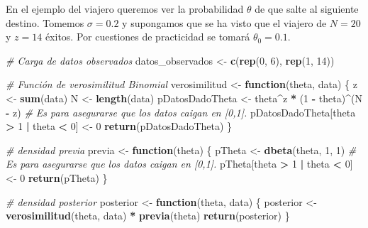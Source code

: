 \documentclass[
  12pt,
]{book}
\newenvironment{Shaded}{\begin{snugshade}}{\end{snugshade}}
\newcommand{\CommentTok}[1]{\textcolor[rgb]{0.56,0.35,0.01}{\textit{#1}}}
\newcommand{\ControlFlowTok}[1]{\textcolor[rgb]{0.13,0.29,0.53}{\textbf{#1}}}
\newcommand{\DecValTok}[1]{\textcolor[rgb]{0.00,0.00,0.81}{#1}}
\newcommand{\KeywordTok}[1]{\textcolor[rgb]{0.13,0.29,0.53}{\textbf{#1}}}
\newcommand{\NormalTok}[1]{#1}
\newcommand{\OperatorTok}[1]{\textcolor[rgb]{0.81,0.36,0.00}{\textbf{#1}}}
\newcommand{\StringTok}[1]{\textcolor[rgb]{0.31,0.60,0.02}{#1}}
\theoremstyle{definition}
\theoremstyle{definition}
\theoremstyle{definition}
\theoremstyle{remark}
\begin{document}
En el ejemplo del viajero queremos ver la probabilidad \(\theta\) de
que salte al siguiente destino. Tomemos \(\sigma=0.2\) y supongamos
que se ha visto que el viajero de \(N=20\) y \(z=14\) éxitos. Por
cuestiones de practicidad se tomará \(\theta_0 = 0.1\).

\begin{Shaded}
\begin{Highlighting}[]
\CommentTok{# Carga de datos observados}
\NormalTok{datos_observados <-}\StringTok{ }\KeywordTok{c}\NormalTok{(}\KeywordTok{rep}\NormalTok{(}\DecValTok{0}\NormalTok{, }\DecValTok{6}\NormalTok{), }\KeywordTok{rep}\NormalTok{(}\DecValTok{1}\NormalTok{, }\DecValTok{14}\NormalTok{))}

\CommentTok{# Función de verosimilitud Binomial}
\NormalTok{verosimilitud <-}\StringTok{ }\ControlFlowTok{function}\NormalTok{(theta, data) \{}
\NormalTok{    z <-}\StringTok{ }\KeywordTok{sum}\NormalTok{(data)}
\NormalTok{    N <-}\StringTok{ }\KeywordTok{length}\NormalTok{(data)}
\NormalTok{    pDatosDadoTheta <-}\StringTok{ }\NormalTok{theta}\OperatorTok{^}\NormalTok{z }\OperatorTok{*}\StringTok{ }\NormalTok{(}\DecValTok{1} \OperatorTok{-}\StringTok{ }\NormalTok{theta)}\OperatorTok{^}\NormalTok{(N }\OperatorTok{-}\StringTok{ }\NormalTok{z)}
    \CommentTok{# Es para asegurarse que los datos caigan en [0,1].}
\NormalTok{    pDatosDadoTheta[theta }\OperatorTok{>}\StringTok{ }\DecValTok{1} \OperatorTok{|}\StringTok{ }\NormalTok{theta }\OperatorTok{<}\StringTok{ }\DecValTok{0}\NormalTok{] <-}\StringTok{ }\DecValTok{0}
    \KeywordTok{return}\NormalTok{(pDatosDadoTheta)}
\NormalTok{\}}

\CommentTok{# densidad previa}
\NormalTok{previa <-}\StringTok{ }\ControlFlowTok{function}\NormalTok{(theta) \{}
\NormalTok{    pTheta <-}\StringTok{ }\KeywordTok{dbeta}\NormalTok{(theta, }\DecValTok{1}\NormalTok{, }\DecValTok{1}\NormalTok{)}
    \CommentTok{# Es para asegurarse que los datos caigan en [0,1].}
\NormalTok{    pTheta[theta }\OperatorTok{>}\StringTok{ }\DecValTok{1} \OperatorTok{|}\StringTok{ }\NormalTok{theta }\OperatorTok{<}\StringTok{ }\DecValTok{0}\NormalTok{] <-}\StringTok{ }\DecValTok{0}
    \KeywordTok{return}\NormalTok{(pTheta)}
\NormalTok{\}}

\CommentTok{# densidad posterior}
\NormalTok{posterior <-}\StringTok{ }\ControlFlowTok{function}\NormalTok{(theta, data) \{}
\NormalTok{    posterior <-}\StringTok{ }\KeywordTok{verosimilitud}\NormalTok{(theta, data) }\OperatorTok{*}\StringTok{ }\KeywordTok{previa}\NormalTok{(theta)}
    \KeywordTok{return}\NormalTok{(posterior)}
\NormalTok{\}}


\end{Highlighting}
\end{Shaded}
\end{document}
